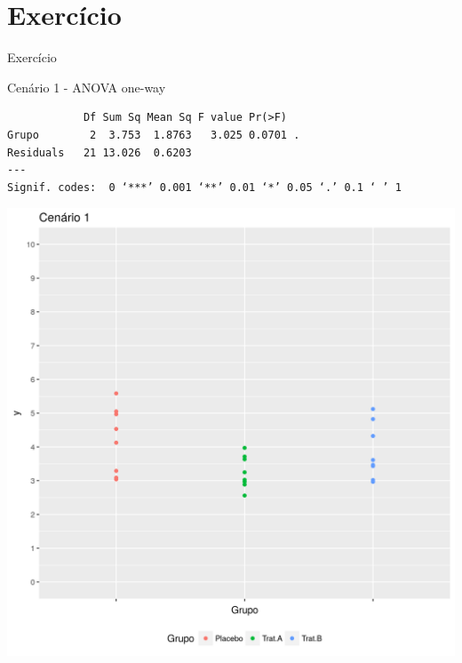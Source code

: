 \documentclass{beamer}
\begin{document}
\section{Exercício}

\begin{frame}[fragile]{Exercício}
  \begin{exampleblock}{Cenário 1 - ANOVA one-way}
    \tiny
\begin{verbatim}
            Df Sum Sq Mean Sq F value Pr(>F)  
Grupo        2  3.753  1.8763   3.025 0.0701 .
Residuals   21 13.026  0.6203                 
---
Signif. codes:  0 ‘***’ 0.001 ‘**’ 0.01 ‘*’ 0.05 ‘.’ 0.1 ‘ ’ 1
\end{verbatim}
    \begin{center}
      \includegraphics[height=.5\textheight]{Cap13-30/cenario1}
    \end{center}
  \end{exampleblock}
\end{frame}
\end{document}
